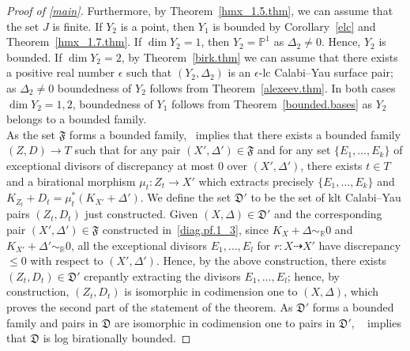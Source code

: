 \documentclass{amsart}[12pt,a4paper]
\theoremstyle{definition}
\newcommand{\rr}{\mathbb{R}}
\begin{document}
\begin{proof}[Proof of \ref{main}]
Furthermore, by Theorem~\ref{hmx_1.5.thm}, we can assume that the set $J$ is finite.
If $Y_2$ is a point, then $Y_1$ is bounded by Corollary~\ref{elc} and Theorem~\ref{hmx_1.7.thm}.
If $\dim Y_2 =1$, then $Y_2 = \mathbb{P}^1$ as $\Delta_2 \neq 0$. Hence, $Y_2$ is bounded.
If $\dim Y_2=2$, by Theorem~\ref{birk.thm} we can assume that there exists a positive real number $\epsilon$ such that $(Y_2, \Delta_2)$ is an $\epsilon$-lc Calabi--Yau surface pair; as $\Delta_2 \neq 0$ boundedness of $Y_2$ follows from Theorem~\ref{alexeev.thm}.
In both cases $\dim Y_2=1, 2$, boundedness of $Y_1$ follows from Theorem~\ref{bounded.bases} as $Y_2$ belongs to a bounded family.
\\
As the set $\mathfrak{F}$ forms a bounded family,~\cite[Proposition 2.5]{HX14} implies that there exists a bounded family $(Z,D)\rightarrow T$ such that for any pair $(X',\Delta') \in \mathfrak{F}$ and for any set $\{E_1, \dots, E_k\}$ of exceptional divisors of discrepancy at most $0$ over $(X', \Delta')$, there exists $t\in T$ and a birational morphism $\mu_t : Z_t \rightarrow X'$ which extracts precisely $\{E_1, \dots, E_k\}$ and $K_{Z_t}+D_t=\mu_t^* (K_{X'} +\Delta')$. 
We define the set $\mathfrak{D}'$ to be the set of klt Calabi--Yau pairs $(Z_t, D_t)$ just constructed.
Given $(X, \Delta) \in \mathfrak{D}'$ and the corresponding pair $(X', \Delta') \in \mathfrak{F}$ constructed in~\eqref{diag.pf.1_3}, since $K_X +\Delta \sim_\rr 0$ and $K_{X'} +\Delta' \sim_\rr 0$, all the exceptional divisors $E_1, \dots, E_l$ for $r \colon X \dashrightarrow X'$ have discrepancy $\leq 0$ with respect to $(X', \Delta')$.
Hence, by the above construction, there exists $(Z_t, D_t) \in \mathfrak{D}'$ crepantly extracting the divisors $E_1, \dots, E_l$; 
hence, by construction, $(Z_t, D_t)$ is isomorphic in codimension one to $(X, \Delta)$, which proves the second part of the statement of the theorem.
As $\mathfrak{D}'$ forms a bounded family and pairs in $\mathfrak{D}$ are isomorphic in codimension one to pairs in $\mathfrak{D}'$, ~\cite[Lemma~2.4.2(3)]{HMX13} implies that $\mathfrak{D}$ is log birationally bounded. 
\end{proof}
\end{document}
